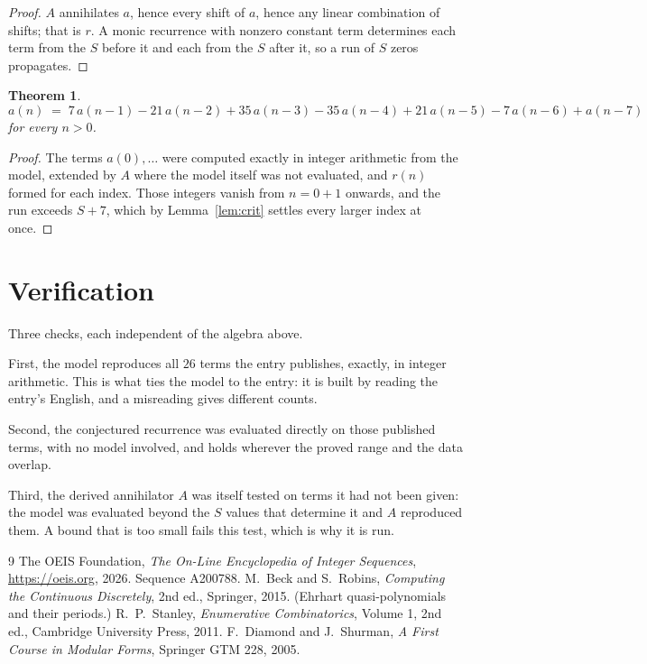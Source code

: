 \documentclass[11pt,a4paper]{article}
\theoremstyle{plain}
\newtheorem{theorem}{Theorem}
\theoremstyle{definition}
\begin{document}
\begin{proof}
$A$ annihilates $a$, hence every shift of $a$, hence any linear combination of shifts; that is
$r$. A monic recurrence with nonzero constant term determines each term from the $S$ before it
and each from the $S$ after it, so a run of $S$ zeros propagates.
\end{proof}

\begin{theorem}
\[
a(n)\;=\;7\,a(n-1) - 21\,a(n-2) + 35\,a(n-3) - 35\,a(n-4) + 21\,a(n-5) - 7\,a(n-6) + a(n-7)
\]
for every $n>0$.
\end{theorem}

\begin{proof}
The terms $a(0),\dots$ were computed exactly in integer arithmetic from the model, extended by
$A$ where the model itself was not evaluated, and $r(n)$ formed for each index. Those integers
vanish from $n=0+1$ onwards, and the run exceeds $S+7$, which by
Lemma~\ref{lem:crit} settles every larger index at once.
\end{proof}

\section{Verification}

Three checks, each independent of the algebra above.

First, the model reproduces all $26$ terms the entry publishes, exactly, in integer
arithmetic. This is what ties the model to the entry: it is built by reading the entry's
English, and a misreading gives different counts.

Second, the conjectured recurrence was evaluated directly on those published terms, with no
model involved, and holds wherever the proved range and the data overlap.

Third, the derived annihilator $A$ was itself tested on terms it had not been given: the model
was evaluated beyond the $S$ values that determine it and $A$ reproduced them. A bound that is
too small fails this test, which is why it is run.

\begin{thebibliography}{9}
 The OEIS Foundation, \emph{The On-Line Encyclopedia of Integer
Sequences}, \url{https://oeis.org}, 2026. Sequence A200788.
 M.~Beck and S.~Robins, \emph{Computing the Continuous Discretely},
2nd ed., Springer, 2015. (Ehrhart quasi-polynomials and their periods.)
 R.~P.~Stanley, \emph{Enumerative Combinatorics}, Volume 1, 2nd ed.,
Cambridge University Press, 2011.
 F.~Diamond and J.~Shurman, \emph{A First Course in Modular Forms},
Springer GTM 228, 2005.
\end{thebibliography}
\end{document}

